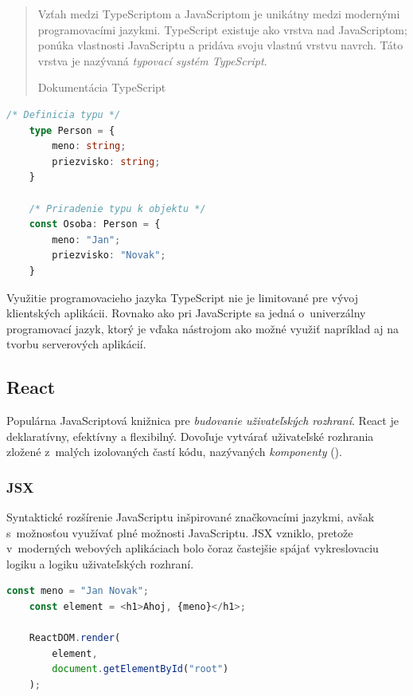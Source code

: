 \blockquote[Dokumentácia TypeScript \cite{TSWeb}]{Vzťah medzi TypeScriptom a JavaScriptom je unikátny medzi modernými programovacími jazykmi. TypeScript existuje ako vrstva nad JavaScriptom; ponúka vlastnosti JavaScriptu a pridáva svoju vlastnú vrstvu navrch. Táto vrstva je nazývaná \emph{typovací systém TypeScript}.}

\begin{lstlisting}[language=TypeScript, caption=Príklad zápisu v~programovacom jazyku TypeScript.]
	/* Definicia typu */
	type Person = {
		meno: string;
		priezvisko: string;
	}

	/* Priradenie typu k objektu */
	const Osoba: Person = {
		meno: "Jan";
		priezvisko: "Novak";
	}
\end{lstlisting}

\bigskip

\noindent Využitie programovacieho jazyka TypeScript nie je limitované pre vývoj klientských aplikácii. Rovnako ako pri JavaScripte sa jedná o~univerzálny programovací jazyk, ktorý je vďaka nástrojom ako  možné využiť napríklad aj na tvorbu serverových aplikácií.

\subsection{React}
\label{subsection:react}
Populárna JavaScriptová knižnica pre \emph{budovanie uživateľských rozhraní}. React je deklaratívny, efektívny a flexibilný. Dovoľuje vytvárať uživateľské rozhrania zložené z~malých izolovaných častí kódu, nazývaných \emph{komponenty} (). \cite{React}

\subsubsection{JSX}
Syntaktické rozšírenie JavaScriptu inšpirované značkovacími jazykmi, avšak s~možnosťou využívať plné možnosti JavaScriptu. JSX vzniklo, pretože v~moderných webových aplikáciach bolo čoraz častejšie spájať vykreslovaciu logiku a logiku uživateľských rozhraní. \cite{React} \\

\begin{lstlisting}[language=TypeScript, caption=Príklad využitia JSX v~React aplikácií. \cite{React}]
	const meno = "Jan Novak";
	const element = <h1>Ahoj, {meno}</h1>;

	ReactDOM.render(
		element,
		document.getElementById("root")
	);
\end{lstlisting}

